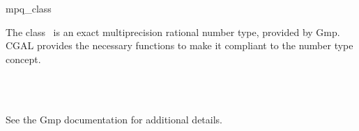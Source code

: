 \ccDefGlobalScope{}

\begin{ccRefClass}{mpq_class}

\ccDefinition

The class \ccRefName\ is an exact multiprecision rational number type,
provided by {\sc Gmp}.
CGAL provides the necessary functions to make it compliant to the number type
concept.


\ccIsModel
{}\\
\\

See the {\sc Gmp} documentation for additional details.

\end{ccRefClass}

